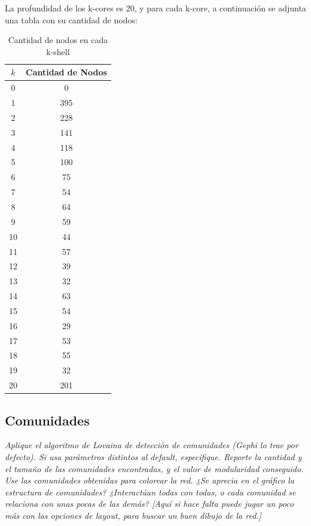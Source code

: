 \documentclass[12pt]{article}
\begin{document}
La profundidad de los k-cores es 20, y para cada k-core, a continuación se adjunta una tabla con su cantidad de nodos:

\begin{table}[H]
    \centering
    \begin{tabular}{|c|c|}
        \hline
        \textbf{\( k \)} & \textbf{Cantidad de Nodos} \\ \hline
        0  & 0   \\ \hline
        1  & 395 \\ \hline
        2  & 228 \\ \hline
        3  & 141 \\ \hline
        4  & 118 \\ \hline
        5  & 100 \\ \hline
        6  & 75  \\ \hline
        7  & 54  \\ \hline
        8  & 64  \\ \hline
        9  & 59  \\ \hline
        10 & 44  \\ \hline
        11 & 57  \\ \hline
        12 & 39  \\ \hline
        13 & 32  \\ \hline
        14 & 63  \\ \hline
        15 & 54  \\ \hline
        16 & 29  \\ \hline
        17 & 53  \\ \hline
        18 & 55  \\ \hline
        19 & 32  \\ \hline
        20 & 201 \\ \hline
    \end{tabular}
    \caption{Cantidad de nodos en cada k-shell}
    \label{tab:k_shells}
\end{table}

\subsection{Comunidades} 
\textit{Aplique el algoritmo de Lovaina de detección de comunidades (Gephi lo trae por defecto). Si usa parámetros distintos al default, especifique. Reporte la cantidad y el tamaño de las comunidades encontradas, y el valor de modularidad conseguido. Use las comunidades obtenidas para colorear la red. ¿Se aprecia en el gráfico la estructura de comunidades? ¿Interactúan todas con todas, o cada comunidad se relaciona con unas pocas de las demás? [Aquí si hace falta puede jugar un poco más con las opciones de layout, para buscar un buen dibujo de la red.]}
\end{document}
